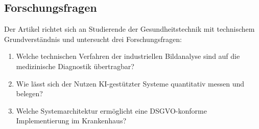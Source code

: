 \subsection{Forschungsfragen} \label{sec:zielsetzung}

Der Artikel richtet sich an Studierende der Gesundheitstechnik mit technischem
Grundverständnis und untersucht drei Forschungsfragen:

\begin{enumerate}
    \item Welche technischen Verfahren der industriellen Bildanalyse sind auf die
          medizinische Diagnostik übertragbar?
    \item Wie lässt sich der Nutzen KI-gestützter Systeme quantitativ messen und belegen?
    \item Welche Systemarchitektur ermöglicht eine DSGVO-konforme Implementierung
          im Krankenhaus?
\end{enumerate}

